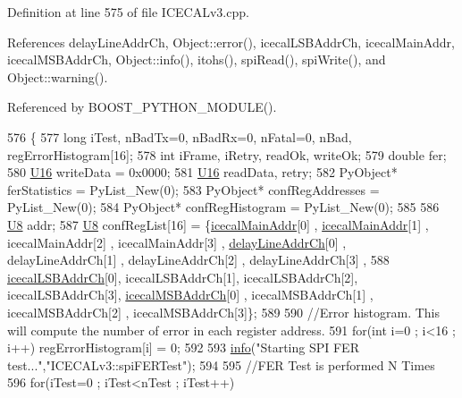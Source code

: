 Definition at line 575 of file I\+C\+E\+C\+A\+Lv3.\+cpp.



References delay\+Line\+Addr\+Ch, Object\+::error(), icecal\+L\+S\+B\+Addr\+Ch, icecal\+Main\+Addr, icecal\+M\+S\+B\+Addr\+Ch, Object\+::info(), itohs(), spi\+Read(), spi\+Write(), and Object\+::warning().



Referenced by B\+O\+O\+S\+T\+\_\+\+P\+Y\+T\+H\+O\+N\+\_\+\+M\+O\+D\+U\+L\+E().


\begin{DoxyCode}
576 \{
577     \textcolor{keywordtype}{long} iTest, nBadTx=0, nBadRx=0, nFatal=0, nBad, regErrorHistogram[16];
578     \textcolor{keywordtype}{int} iFrame, iRetry, readOk, writeOk;
579     \textcolor{keywordtype}{double} fer;
580     \hyperlink{ICECALv3_8h_adf928e51a60dba0df29d615401cc55a8}{U16} writeData = 0x0000;
581     \hyperlink{ICECALv3_8h_adf928e51a60dba0df29d615401cc55a8}{U16} readData, retry;
582     PyObject* ferStatistics         = PyList\_New(0); 
583     PyObject* confRegAddresses  = PyList\_New(0);
584     PyObject* confRegHistogram  = PyList\_New(0);
585 
586     \hyperlink{ICECALv3_8h_a3cb25ca6f51f003950f9625ff05536fc}{U8}  addr;
587     \hyperlink{ICECALv3_8h_a3cb25ca6f51f003950f9625ff05536fc}{U8}  confRegList[16] = \{\hyperlink{ICECALv3_8h_a9c22ae782814495416dc2b803df326c1}{icecalMainAddr}[0] , \hyperlink{ICECALv3_8h_a9c22ae782814495416dc2b803df326c1}{icecalMainAddr}[1] , 
      icecalMainAddr[2] , icecalMainAddr[3] , \hyperlink{ICECALv3_8h_a848408b773702d268053cb49d205e097}{delayLineAddrCh}[0] , delayLineAddrCh[1] , delayLineAddrCh[2] , 
      delayLineAddrCh[3] ,
588                                                  \hyperlink{ICECALv3_8h_abd124f50fa794b9b0aded801fabf5322}{icecalLSBAddrCh}[0], icecalLSBAddrCh[1], 
      icecalLSBAddrCh[2], icecalLSBAddrCh[3], \hyperlink{ICECALv3_8h_afba64a649cc9314882fd49b62b99d6e7}{icecalMSBAddrCh}[0] , icecalMSBAddrCh[1] , 
      icecalMSBAddrCh[2] , icecalMSBAddrCh[3]\};
589 
590     \textcolor{comment}{//Error histogram. This will compute the number of error in each register address.}
591     \textcolor{keywordflow}{for}(\textcolor{keywordtype}{int} i=0 ; i<16 ; i++) regErrorHistogram[i] = 0;
592 
593     \hyperlink{classObject_a644fd329ea4cb85f54fa6846484b84a8}{info}(\textcolor{stringliteral}{"Starting SPI FER test..."},\textcolor{stringliteral}{"ICECALv3::spiFERTest"});
594 
595     \textcolor{comment}{//FER Test is performed N Times}
596     \textcolor{keywordflow}{for}(iTest=0 ; iTest<nTest ; iTest++)

\end{DoxyCode}

